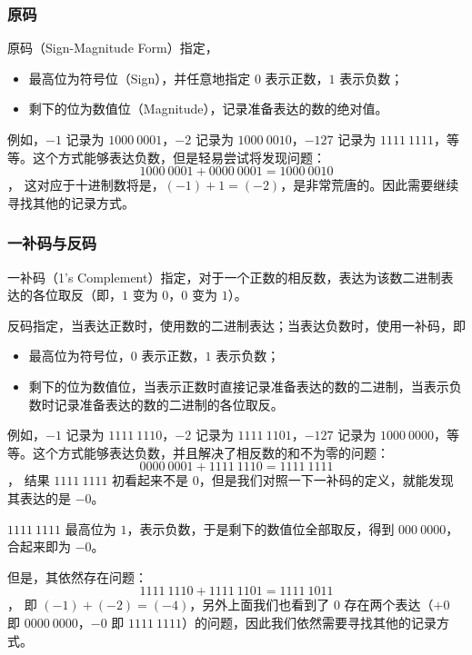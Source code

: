         \subsubsection{原码}\label{subsubsec:ArithBasics/positional-notation-presentation/binary/sign-magnitude}
            原码（Sign-Magnitude Form）指定，
            \begin{itemize}
                \item 最高位为符号位（Sign），并任意地指定 $0$ 表示正数，$1$ 表示负数；
                \item 剩下的位为数值位（Magnitude），记录准备表达的数的绝对值。
            \end{itemize}

            例如，$-1$ 记录为 $1000\ 0001$，$-2$ 记录为 $1000\ 0010$，$-127$ 记录为 $1111\ 1111$，等等。这个方式能够表达负数，但是轻易尝试将发现问题：
            \[1000\ 0001 + 0000\ 0001 = 1000\ 0010\]，
            这对应于十进制数将是，$(-1) + 1 = (-2)$，是非常荒唐的。因此需要继续寻找其他的记录方式。

        \subsubsection{一补码与反码}\label{subsubsec:ArithBasics/positional-notation-presentation/binary/one-complement}
            一补码（1's Complement）指定，对于一个正数的相反数，表达为该数二进制表达的各位取反（即，$1$ 变为 $0$，$0$ 变为 $1$）。

            反码指定，当表达正数时，使用数的二进制表达；当表达负数时，使用一补码，即
            \begin{itemize}
                \item 最高位为符号位，$0$ 表示正数，$1$ 表示负数；
                \item 剩下的位为数值位，当表示正数时直接记录准备表达的数的二进制，当表示负数时记录准备表达的数的二进制的各位取反。
            \end{itemize}

            例如，$-1$ 记录为 $1111\ 1110$，$-2$ 记录为 $1111\ 1101$，$-127$ 记录为 $1000\ 0000$，等等。这个方式能够表达负数，并且解决了相反数的和不为零的问题：
            \[0000\ 0001 + 1111\ 1110 = 1111\ 1111\]，
            结果 $1111\ 1111$ 初看起来不是 $0$，但是我们对照一下一补码的定义，就能发现其表达的是 $-0$。
            \begin{displayquote}
                $1111\ 1111$ 最高位为 $1$，表示负数，于是剩下的数值位全部取反，得到 $000\ 0000$，合起来即为 $-0$。
            \end{displayquote}
            但是，其依然存在问题：
            \[1111\ 1110 + 1111\ 1101 = 1111\ 1011\]，
            即 $(-1) + (-2) = (-4)$，另外上面我们也看到了 $0$ 存在两个表达（$+0$ 即 $0000\ 0000$，$-0$ 即 $1111\ 1111$）的问题，因此我们依然需要寻找其他的记录方式。

